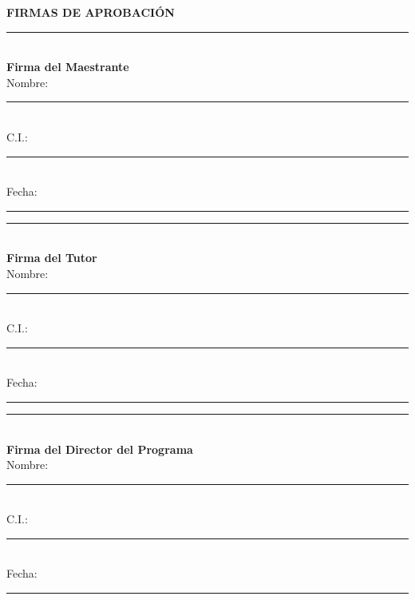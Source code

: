 \documentclass[12pt,a4paper]{report}
\begin{document}


\tableofcontents
\listoffigures
\listoftables

\lstlistoflistings

\newpage










\appendix


\newpage
\thispagestyle{empty} %
\vspace*{3cm}

\begin{center}
\Large\textbf{FIRMAS DE APROBACIÓN}
\end{center}

\vspace{4cm}

\begin{minipage}[t]{0.45\textwidth}
\centering
\rule{8cm}{0.5pt}\\[0.5cm]
\textbf{Firma del Maestrante}\\[0.3cm]
Nombre: \rule{6cm}{0.5pt}\\[0.3cm]
C.I.: \rule{4cm}{0.5pt}\\[0.3cm]
Fecha: \rule{4cm}{0.5pt}
\end{minipage}
\hfill
\begin{minipage}[t]{0.45\textwidth}
\centering
\rule{8cm}{0.5pt}\\[0.5cm]
\textbf{Firma del Tutor}\\[0.3cm]
Nombre: \rule{6cm}{0.5pt}\\[0.3cm]
C.I.: \rule{4cm}{0.5pt}\\[0.3cm]
Fecha: \rule{4cm}{0.5pt}
\end{minipage}

\vspace{3cm}

\begin{center}
\rule{8cm}{0.5pt}\\[0.5cm]
\textbf{Firma del Director del Programa}\\[0.3cm]
Nombre: \rule{6cm}{0.5pt}\\[0.3cm]
C.I.: \rule{4cm}{0.5pt}\\[0.3cm]
Fecha: \rule{4cm}{0.5pt}
\end{center}
\end{document}
